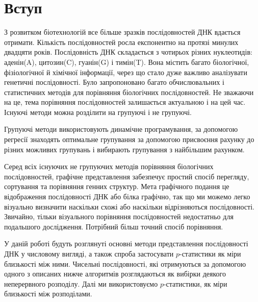 \documentclass[14pt,a4paper,titlepage]{extarticle}
\begin{document}
\section{Вступ}
З розвитком біотехнологій все більше зразків послідовностей ДНК вдається
отримати. Кількість послідовностей росла експонентно на протязі минулих
двадцяти років. Послідовність ДНК складається з чотирьох різних нуклеотидів:
аденін(A), цитозин(C), гуанін(G) і тимін(T). Вона містить багато біологічної,
фізіологічної й хімічної інформації, через що стало дуже важливо аналізувати
генетичні послідовності. Було запропоновано багато обчислювальних і
статистичних методів для порівняння біологічних послідовностей. Не зважаючи на
це, тема порівняння послідовностей залишається актуальною і на цей час. Існуючі
методи можна розділити на групуючі і не групуючі. \par
Групуючі методи використовують динамічне програмування, за допомогою регресії знаходять оптимальне групування за допомогою присвоєння рахунку до різних можливих групувань і вибирають групування з найбільшим рахунком. \par
Серед всіх існуючих не групуючих методів порівняння біологічних послідовностей, графічне представлення забезпечує простий спосіб перегляду, сортування та порівняння генних структур. Мета графічного подання це відображення послідовності ДНК або білка графічно, так що ми можемо легко візуально визначити наскільки схожі або наскільки відрізняються послідовності. Звичайно, тільки візуального порівняння послідовностей недостатньо для подальшого дослідження. Потрібний більш точний спосіб порівняння. \par
У даній роботі будуть розглянуті основні методи представлення послідовності ДНК у числовому вигляді, а також спроба застосувати $p$-статистики як міри близькості між ними. Чисельні послідовності, які отримуються за допомогою одного з описаних нижче алгоритмів розглядаються як вибірки деякого неперервного розподілу. Далі ми використовуємо $p$-статистики, як міри близькості між розподілами.


\newpage
\end{document}
